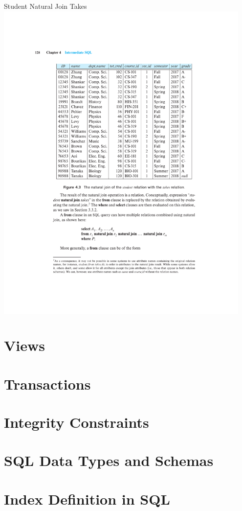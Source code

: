 \documentclass{beamer}
\begin{document}
\begin{frame}{Student Natural Join Takes}
    \centering
    \includegraphics[width=0.95\textwidth, trim={3cm 12cm 3cm 4.5cm}, clip]{pages/nj3.pdf}
\end{frame}




\section{Views}
\section{Transactions}
\section{Integrity Constraints}
\section{SQL Data Types and Schemas}
\section{Index Definition in SQL}
\end{document}

